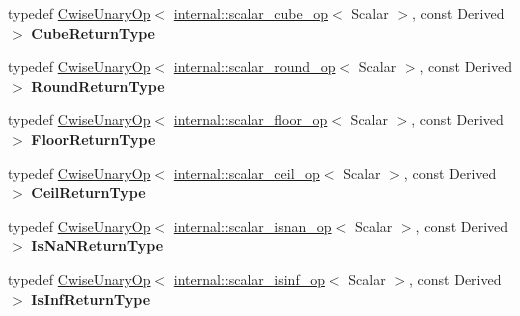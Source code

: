 \begin{DoxyCompactItemize}
\item 
\mbox{\label{class_eigen_1_1_array_base_a0b979bb983f57164f65d5fa94e06d30d}} 
typedef \mbox{\hyperlink{class_eigen_1_1_cwise_unary_op}{Cwise\+Unary\+Op}}$<$ \mbox{\hyperlink{struct_eigen_1_1internal_1_1scalar__cube__op}{internal\+::scalar\+\_\+cube\+\_\+op}}$<$ Scalar $>$, const Derived $>$ {\bfseries Cube\+Return\+Type}
\item 
\mbox{\label{class_eigen_1_1_array_base_aff5254c2f86edc8eb0ac635b34adb6e2}} 
typedef \mbox{\hyperlink{class_eigen_1_1_cwise_unary_op}{Cwise\+Unary\+Op}}$<$ \mbox{\hyperlink{struct_eigen_1_1internal_1_1scalar__round__op}{internal\+::scalar\+\_\+round\+\_\+op}}$<$ Scalar $>$, const Derived $>$ {\bfseries Round\+Return\+Type}
\item 
\mbox{\label{class_eigen_1_1_array_base_a8661062b6450dfacacf5fd524ba24cf4}} 
typedef \mbox{\hyperlink{class_eigen_1_1_cwise_unary_op}{Cwise\+Unary\+Op}}$<$ \mbox{\hyperlink{struct_eigen_1_1internal_1_1scalar__floor__op}{internal\+::scalar\+\_\+floor\+\_\+op}}$<$ Scalar $>$, const Derived $>$ {\bfseries Floor\+Return\+Type}
\item 
\mbox{\label{class_eigen_1_1_array_base_a518d66075e790231ef28643be077d475}} 
typedef \mbox{\hyperlink{class_eigen_1_1_cwise_unary_op}{Cwise\+Unary\+Op}}$<$ \mbox{\hyperlink{struct_eigen_1_1internal_1_1scalar__ceil__op}{internal\+::scalar\+\_\+ceil\+\_\+op}}$<$ Scalar $>$, const Derived $>$ {\bfseries Ceil\+Return\+Type}
\item 
\mbox{\label{class_eigen_1_1_array_base_ad8c9538d9ffa85389f8ab2aa03fb792b}} 
typedef \mbox{\hyperlink{class_eigen_1_1_cwise_unary_op}{Cwise\+Unary\+Op}}$<$ \mbox{\hyperlink{struct_eigen_1_1internal_1_1scalar__isnan__op}{internal\+::scalar\+\_\+isnan\+\_\+op}}$<$ Scalar $>$, const Derived $>$ {\bfseries Is\+Na\+N\+Return\+Type}
\item 
\mbox{\label{class_eigen_1_1_array_base_a6b51941b55dd151feb211a789b0dfc4f}} 
typedef \mbox{\hyperlink{class_eigen_1_1_cwise_unary_op}{Cwise\+Unary\+Op}}$<$ \mbox{\hyperlink{struct_eigen_1_1internal_1_1scalar__isinf__op}{internal\+::scalar\+\_\+isinf\+\_\+op}}$<$ Scalar $>$, const Derived $>$ {\bfseries Is\+Inf\+Return\+Type}

\end{DoxyCompactItemize}
